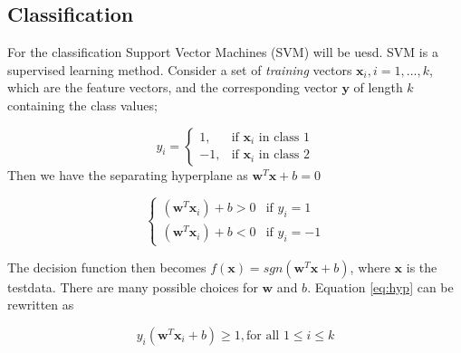 \documentclass{article}
\begin{document}



\subsection{Classification}
For the classification Support Vector Machines (SVM) will be uesd. SVM is a supervised learning method. 
Consider a set of \textit{training} vectors $ \textbf{x}_{i}, i = 1,...,k $, which are the feature vectors, and the corresponding vector $ \textbf{y} $ of length $ k $ containing the class values; 

\begin{equation}
y_{i} =
\begin{cases}
1, & \text{if $\textbf{x}_{i}$ in class 1} \\
-1,
& \text{if $\textbf{x}_{i}$ in class 2}
\end{cases}
\end{equation}
Then we have the separating hyperplane as $\textbf{w}^{T}\textbf{x} + b = 0$

\begin{equation}
\label{eq:hyp}
\begin{cases}
(\textbf{w}^{T}\textbf{x}_{i}) + b > 0 & \text{if $y_{i} = 1$} \\
(\textbf{w}^{T}\textbf{x}_{i}) + b < 0 & \text{if $y_{i} = -1$}
\end{cases}
\end{equation}

The decision function then becomes $f(\textbf{x}) = sgn(\textbf{w}^{T}\textbf{x} + b)$, where $ \textbf{x} $ is the testdata. There are many possible choices for $\textbf{w}$ and $b$.
Equation \ref{eq:hyp} can be rewritten as 

\begin{equation}
y_{i}(\textbf{w}^{T}\textbf{x}_{i} + b) \geq 1, \text{for all $1 \leq i \leq k$}
\end{equation}
\end{document}

